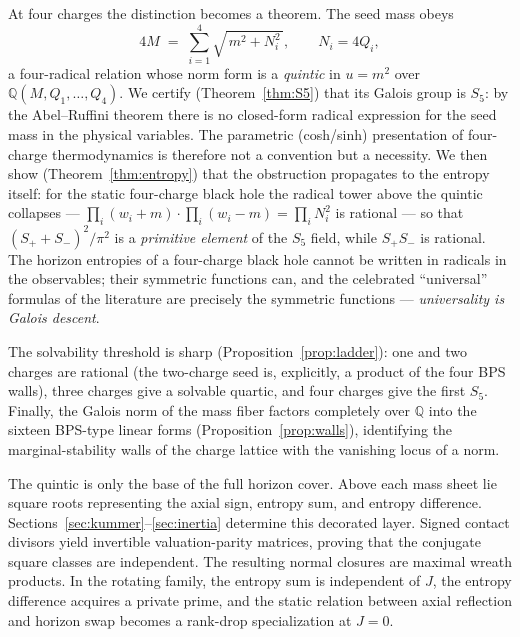 \documentclass[11pt]{article}
\theoremstyle{definition}
\theoremstyle{remark}
\newcommand{\Q}{\mathbb{Q}}
\begin{document}
At four charges the distinction becomes a theorem. The seed mass obeys
\begin{equation}
4M \;=\; \sum_{i=1}^{4}\sqrt{\,m^2+N_i^2\,},\qquad N_i=4Q_i ,
\label{eq:massfiber}
\end{equation}
a four-radical relation whose norm form is a \emph{quintic} in $u=m^2$ over
$\Q(M,Q_1,\dots,Q_4)$. We certify (Theorem~\ref{thm:S5}) that its Galois group
is $S_5$: by the Abel--Ruffini theorem there is no closed-form radical
expression for the seed mass in the physical variables. The parametric
(cosh/sinh) presentation of four-charge thermodynamics is therefore not a
convention but a necessity. We then show (Theorem~\ref{thm:entropy}) that the
obstruction propagates to the entropy itself: for the static four-charge black
hole the radical tower above the quintic collapses --- $\prod_i(w_i+m)\cdot
\prod_i(w_i-m)=\prod_i N_i^2$ is rational --- so that
$(S_++S_-)^2/\pi^2$ is a \emph{primitive element} of the $S_5$ field, while
$S_+S_-$ is rational. The horizon entropies of a four-charge black hole cannot
be written in radicals in the observables; their symmetric functions can, and
the celebrated ``universal'' formulas of the literature are precisely the
symmetric functions --- \emph{universality is Galois descent}.

The solvability threshold is sharp (Proposition~\ref{prop:ladder}): one and
two charges are rational (the two-charge seed is, explicitly, a product of the
four BPS walls), three charges give a solvable quartic, and four charges give
the first $S_5$. Finally, the Galois norm of the mass fiber factors completely
over $\Q$ into the sixteen BPS-type linear forms (Proposition~\ref{prop:walls}),
identifying the marginal-stability walls of the charge lattice with the
vanishing locus of a norm.

The quintic is only the base of the full horizon cover.  Above each mass
sheet lie square roots representing the axial sign, entropy sum, and entropy
difference.  Sections~\ref{sec:kummer}--\ref{sec:inertia} determine this
decorated layer.  Signed contact divisors yield invertible valuation-parity
matrices, proving that the conjugate square classes are independent.  The
resulting normal closures are maximal wreath products.  In the rotating
family, the entropy sum is independent of $J$, the entropy difference acquires
a private prime, and the static relation between axial reflection and horizon
swap becomes a rank-drop specialization at $J=0$.
\end{document}
